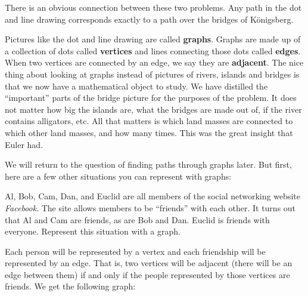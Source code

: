 \documentclass[11pt,]{book}
\newcommand{\terminology}[1]{\textbf{#1}}
\theoremstyle{ptxplainnotitle}
\theoremstyle{ptxplaintitle}
\theoremstyle{ptxdefinitionnotitle}
\theoremstyle{ptxdefinitiontitle}
\theoremstyle{ptxdefinitionnotitle}
\theoremstyle{ptxdefinitiontitle}
\theoremstyle{ptxdefinitionnotitle}
\theoremstyle{ptxdefinitiontitle}
\theoremstyle{ptxdefinitiontitlenonumber}
\theoremstyle{ptxdefinitiontitlenonumber}
\numberwithin{equation}{chapter}
\newcommand{\vtx}[2]{node[fill,circle,inner sep=0pt, minimum size=4pt,label=#1:#2]{}}
\newcommand{\vb}[1]{\vtx{below}{#1}}
\newcommand{\vr}[1]{\vtx{right}{#1}}
\newcommand{\vl}[1]{\vtx{left}{#1}}
\begin{document}
There is an obvious connection between these two problems. Any path in the dot and line drawing corresponds exactly to a path over the bridges of Königsberg.%
\par
\hypertarget{p-2463}{}%
Pictures like the dot and line drawing are called \terminology{graphs}. Graphs are made up of a collection of dots called \terminology{vertices} and lines connecting those dots called \terminology{edges}. When two vertices are connected by an edge, we say they are \terminology{adjacent}. The nice thing about looking at graphs instead of pictures of rivers, islands and bridges is that we now have a mathematical object to study. We have distilled the ``important'' parts of the bridge picture for the purposes of the problem. It does not matter how big the islands are, what the bridges are made out of, if the river contains alligators, etc. All that matters is which land masses are connected to which other land masses, and how many times. This was the great insight that Euler had.%
\par
\hypertarget{p-2464}{}%
We will return to the question of finding paths through graphs later. But first, here are a few other situations you can represent with graphs:%
\begin{example}\label{example-73}
\hypertarget{p-2465}{}%
Al, Bob, Cam, Dan, and Euclid are all members of the social networking website \emph{Facebook}. The site allows members to be ``friends'' with each other. It turns out that Al and Cam are friends, as are Bob and Dan. Euclid is friends with everyone. Represent this situation with a graph.%
\par\smallskip%
\noindent\textbf{}\hypertarget{solution-271}{}\hypertarget{p-2466}{}%
Each person will be represented by a vertex and each friendship will be represented by an edge. That is, two vertices will be adjacent (there will be an edge between them) if and only if the people represented by those vertices are friends. We get the following graph:%
\begin{sidebyside}{1}{0.4}{0.4}{0}
\begin{sbspanel}{0.2}
\resizebox{\linewidth}{!}{{
        \begin{tikzpicture}[scale=0.7]
  \draw(-1, 0) \vl{C} -- (0,1) \vb{E} -- (-1,2) \vl{A} -- (-1,0)(1,0) \vr{D} -- (0,1)  -- (1,2) \vr{B} -- (1,0);
\end{tikzpicture}
}
}
\end{sbspanel}
\end{sidebyside}
\end{example}
\end{document}
